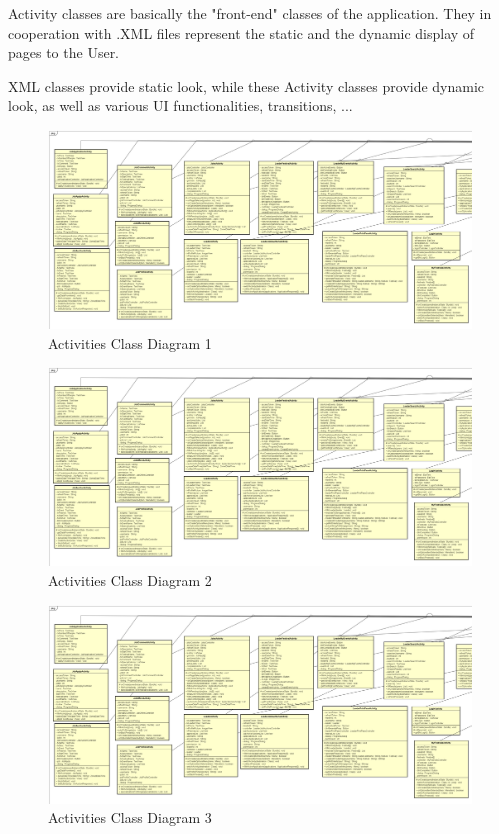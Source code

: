Activity classes are basically the "front-end" classes of the application. They in cooperation with .XML files represent the static and the dynamic display of pages to the User.

XML classes provide static look, while these Activity classes provide dynamic look, as well as various UI functionalities, transitions, ...

\begin{figure}[H]
	\includegraphics[width=\linewidth]{diagrams/Activities Class Diagram_1.png}
	\caption{Activities Class Diagram 1}
	\label{fig:activities_class_diag_1}
\end{figure}

\begin{figure}[H]
	\includegraphics[width=\linewidth]{diagrams/Activities Class Diagram_1.png}
	\caption{Activities Class Diagram 2}
	\label{fig:activities_class_diag_2}
\end{figure}

\begin{figure}[H]
	\includegraphics[width=\linewidth]{diagrams/Activities Class Diagram_1.png}
	\caption{Activities Class Diagram 3}
	\label{fig:activities_class_diag_3}
\end{figure}

